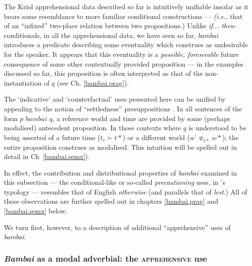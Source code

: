 \xe

The Kriol apprehensional data described so far is intuitively unifiable insofar as it bears some resemblance to more familiar conditional constructions --- \textit{(i.e.}, that of an ``infixed'' two-place relation between two propositions.) Unlike \textit{if... then}-conditionals, in all the apprehensional data, we have seen so far, \textit{bambai} introduces a predicate describing some eventuality which construes as undesirable for the speaker. It appears that this eventuality is a \textit{possible, foreseeable} future consequence of some other contextually provided proposition --- in the examples discussed so far, this proposition is often interpreted as that of the non-instantiation of $ q $ (see Ch. \ref{bambai.prag}). 

The `indicative' and `counterfactual' uses presented here can be unified by appealing to the notion of ``settledness'' presuppositions \citep[\textit{e.g.,}][82, \textit{passim}]{Condoravdi2002}. In all sentences of the form $ p \textit{ bambai }q$, a reference world and time are provided by some (perhaps modalised) antecedent proposition. In those contexts where $ q $ is understood to be being asserted of a future time ($t_e\succ t*$) or a different world ($w^\prime\not\approx_{t*} w*$); 
 the entire proposition construes as modalised. This intuition will be spelled out in detail in Ch~\ref{bambai.semx}).  %

In effect, the contribution and distributional properties of \textit{bambai} examined in this subsection --- the conditional-like or so-called \textit{precautioning} uses, in \citeauthor{Lichtenberk1995}'s typology --- resembles that of English \textit{otherwise} (and parallels that of \textit{lest}.)
All of these observations are further spelled out in chapters \ref{bambai.prag} and \ref{bambai.semx} below. 

We turn first, however, to a description of additional ``apprehensive'' uses of \textit{bambai}.

\subsubsection[Apprehensive uses]{\textit{Bambai} as a modal adverbial: the \textsc{apprehensive} use}
\label{ep.adv}

